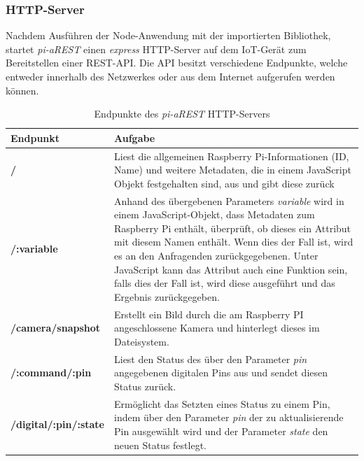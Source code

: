 \subsubsection{HTTP-Server}
Nachdem Ausführen der Node-Anwendung mit der importierten Bibliothek, startet \textit{pi-aREST} einen 
\textit{express} HTTP-Server auf dem IoT-Gerät zum Bereitstellen einer REST-API. Die API besitzt
verschiedene Endpunkte, welche entweder innerhalb des Netzwerkes oder aus dem Internet aufgerufen werden
können.  \cite{piarestgtihub}

\begin{table}[h!]
  \footnotesize
  \centering
  \label{tab:security-threats}
  \begin{tabular}{p{4cm}p{9cm}}
    \textbf{Endpunkt} & \textbf{Aufgabe}\\
    \hline
    \textbf{/} & Liest die allgemeinen Raspberry Pi-Informationen (ID, Name) und weitere
		    Metadaten, die in einem JavaScript Objekt festgehalten sind, aus und gibt 
		   diese zurück  \\

    \textbf{/:variable} & Anhand des übergebenen Parameters \textit{variable} wird in einem 
				JavaScript-Objekt, dass Metadaten zum Raspberry Pi enthält, überprüft, ob dieses ein
				Attribut mit diesem Namen enthält. Wenn dies der Fall ist, wird es an den
				Anfragenden zurückgegebenen. Unter JavaScript kann das Attribut auch
				eine Funktion sein, falls dies der Fall ist, wird diese ausgeführt und das 
				Ergebnis zurückgegeben. \\

    \textbf{/camera/snapshot} & Erstellt ein Bild durch die am Raspberry PI angeschlossene Kamera 
					     und hinterlegt dieses im Dateisystem.  \\

    \textbf{/:command/:pin} & Liest den Status des über den Parameter \textit{pin} angegebenen digitalen
					Pins aus und sendet diesen Status zurück.   \\

    \textbf{/digital/:pin/:state} & Ermöglicht das Setzten eines Status zu einem Pin, indem über den Parameter 
					\textit{pin} der zu aktualisierende Pin ausgewählt wird und der Parameter
					\textit{state} den neuen Status festlegt.  \\
  \end{tabular}
  \caption{Endpunkte des \textit{pi-aREST} HTTP-Servers \cite{piarestgtihub}}
\end{table}

